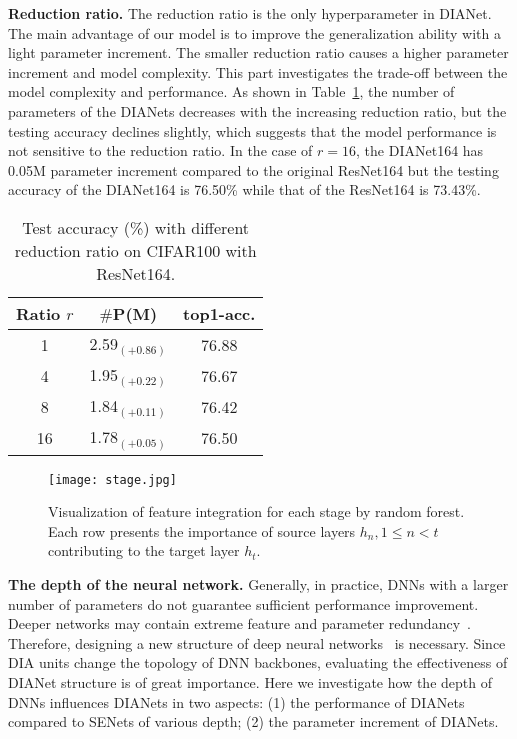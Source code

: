 \documentclass[letterpaper]{article} \usepackage{aaai20}  \usepackage{times}  \usepackage{helvet} \usepackage{courier}  \usepackage[hyphens]{url}  \usepackage{graphicx} \urlstyle{rm} \def\UrlFont{\rm}  \usepackage{graphicx}  \frenchspacing  \setlength{\pdfpagewidth}{8.5in}  \setlength{\pdfpageheight}{11in}  \usepackage{color}
\begin{document}
	\noindent\textbf{Reduction ratio.} The reduction ratio is the only hyperparameter in DIANet. The main advantage of our model is to improve the generalization ability with a light parameter increment. The smaller reduction ratio causes a higher parameter increment and model complexity. This part investigates the trade-off between the model complexity and performance. As shown in Table~\ref{tab:reduction ratio}, the number of parameters of the DIANets decreases with the increasing reduction ratio, but the testing accuracy declines slightly, which suggests that the model performance is not sensitive to the reduction ratio. In the case of $r=16$, the DIANet164 has 0.05M parameter increment compared to the original ResNet164 but the testing accuracy of the DIANet164 is 76.50\% while that of the ResNet164 is 73.43\%. 
	\begin{table}[htbp]
	    \centering
	\small
			\centering
			\begin{tabular}{|c|c|c|}
				\midrule
				Ratio $r$ & $\#$P(M) & top1-acc. \\
				\midrule
				1  & 2.59$_{(+0.86)}$ & 76.88  \\
				4  & 1.95$_{(+0.22)}$  & 76.67  \\
				8  & 1.84$_{(+0.11)}$  & 76.42  \\
				16  & 1.78$_{(+0.05)}$  & 76.50  \\
				\bottomrule
			\end{tabular}\caption{Test accuracy (\%) with different reduction ratio on CIFAR100 with ResNet164.}
			\label{tab:reduction ratio}\end{table}{}
	\begin{figure*}[h]

		\centering
		\texttt{[image: stage.jpg]}
		\caption{Visualization of feature integration for each stage by random forest. Each row presents the importance of source layers $h_n,1\leq n < t$ contributing to the target layer $h_t$.}
		\label{features integration for each stage}
	\end{figure*}
	
	\noindent\textbf{The depth of the neural network.} Generally, in practice, DNNs with a larger number of parameters do not guarantee sufficient performance improvement. Deeper networks may contain extreme feature and parameter redundancy~\cite{huang2017densely}. Therefore,  designing a new structure of deep neural networks~\cite{he2016deep,huang2017densely,srivastava2015training,hu2018squeeze,hu2018gather,wang2018non} is necessary. Since DIA units change the topology of DNN backbones, evaluating the effectiveness of DIANet structure is of great importance. Here we investigate how the depth of DNNs influences DIANets in two aspects: (1) the performance of DIANets compared to SENets of various depth; (2) the parameter increment of DIANets. 
	
\end{document}
